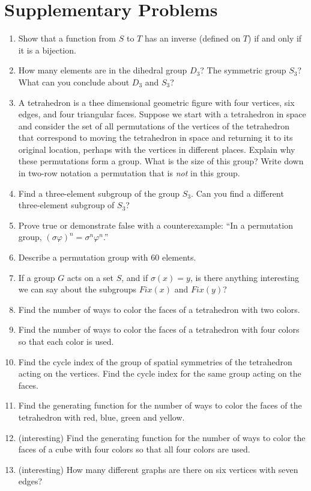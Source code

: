 \documentclass[10pt,]{book}
\theoremstyle{plain}
\theoremstyle{definition}
\numberwithin{equation}{chapter}
\begin{document}
\section[{Supplementary Problems}]{Supplementary Problems}\label{sec_groups-suppprobs}
\leavevmode%
\begin{enumerate}
\item\hypertarget{li-100}{}Show that a function from \(S\) to \(T\) has an inverse (defined on \(T\)) if and only if it is a bijection.%
\item\hypertarget{li-101}{}How many elements are in the dihedral group \(D_3\)?  The symmetric group \(S_3\)?  What can you conclude about \(D_3\) and \(S_3\)?%
\item\hypertarget{li-102}{}A tetrahedron is a thee dimensional geometric figure with four vertices, six edges, and four triangular faces.  Suppose we start with a tetrahedron in space and consider the set of all permutations of the vertices of the tetrahedron that correspond to moving the tetrahedron in space and returning it to its original location, perhaps with the vertices in different places.  Explain why these permutations form a group.  What is the size of this group?  Write down in two-row notation a permutation that is \emph{not} in this group.%
\item\hypertarget{li-103}{}Find a three-element subgroup of the group \(S_3\).  Can you find a different three-element subgroup of \(S_3\)?%
\item\hypertarget{li-104}{}Prove true or demonstrate false with a counterexample:  ``In a permutation group, \((\sigma\varphi)^n = \sigma^n\varphi^n\).''%
\item\hypertarget{li-105}{}Describe a permutation group with 60 elements.%
\item\hypertarget{li-106}{}If a group \(G\) acts on a set \(S\), and if \(\sigma(x) =y\), is there anything interesting we can say about the subgroups \({ Fix}(x)\) and \({ Fix}(y)\)?%
\item\hypertarget{li-107}{}Find the number of ways to color the faces of a tetrahedron with two colors.%
\item\hypertarget{li-108}{}Find the number of ways to color the faces of a tetrahedron with four colors so that each color is used.%
\item\hypertarget{li-109}{}Find the cycle index of the group of spatial symmetries of the tetrahedron acting on the vertices.  Find the cycle index for the same group acting on the faces.%
\item\hypertarget{li-110}{}Find the generating function for the number of ways to color the faces of the tetrahedron with red, blue, green and yellow.%
\item\hypertarget{li-111}{}(interesting) Find the generating function for the number of ways to color the faces of a cube with four colors so that all four colors are used.%
\item\hypertarget{li-112}{}(interesting) How many different graphs are there on six vertices with seven edges?%
\end{enumerate}
\end{document}
